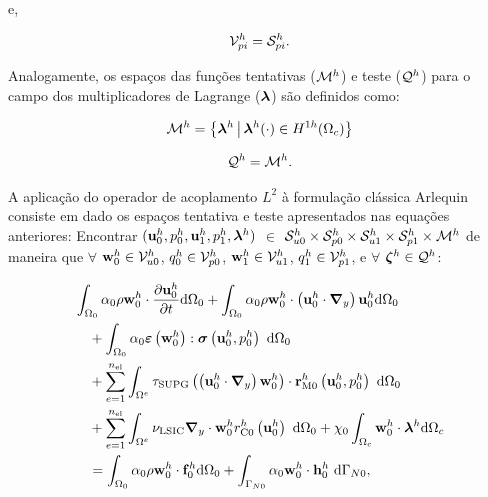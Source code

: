 \noindent e,

\begin{align}
	\mathcal{V}_{pi}^h = \mathcal{S}_{pi}^h.
\end{align}

Analogamente, os espaços das funções tentativas ($\mathcal{M}^h$) e teste ($\mathcal{Q}^h$) para o campo dos multiplicadores de Lagrange ($\boldsymbol{\lambda}$) são definidos como:

\begin{align}
	\mathcal{M}^h = \left\{ \boldsymbol{\lambda}^{h} \,\middle|\, \boldsymbol{\lambda}^{h}(\cdot) \in H^{1h}(\Omega_c) \right\}
\end{align}

\begin{align}
	\mathcal{Q}^h = \mathcal{M}^h.
\end{align}

A aplicação do operador de acoplamento $L^{2}$ à formulação clássica Arlequin consiste em dado os espaços tentativa e teste apresentados nas equações anteriores: Encontrar $(\mathbf{u}_0^h,p_0^h,\mathbf{u}_1^h,p_1^h,\boldsymbol{\lambda}^h)$ $\in$ $\mathcal{S}_{u0}^h \times \mathcal{S}_{p0}^h \times \mathcal{S}_{u1}^h \times \mathcal{S}_{p1}^h \times \mathcal{M}^h$ de maneira que  $\forall$ $\mathbf{w}_0^h \in \mathcal{V}_{u0}^h$, $q_0^h \in \mathcal{V}_{p0}^h$, $\mathbf{w}_1^h \in \mathcal{V}_{u1}^h$, $q_1^h \in \mathcal{V}_{p1}^h$, e $\forall$ $\boldsymbol{\zeta}^h \in \mathcal{Q}^h$:

\begin{align}
	\begin{split}
		&\int_{\globalModel} \arlequinWFGlobal \density \wglobalh \cdot \frac{\partial\uglobalh}{\partial t} \deriv \globalModel +
		\int_{\globalModel} \arlequinWFGlobal \density \wglobalh \cdot  \left(\uglobalh \cdot \gradient \right) \uglobalh \deriv \globalModel  \\ 
		&\quad+	
		\int_{\globalModel} \arlequinWFGlobal \straintensor \left(\wglobalh\right) : \stressTensor \left(\uglobalh,\pglobalh\right)\ \deriv \globalModel \\
		&\quad+ \sum_{e=1}^{\nel} \int_{\domainE} \SUPG  \left(\left(\uglobalh \cdot \gradient \right) \wglobalh\right) \cdot \resMomGlobal\left(\uglobalh,\pglobalh \right)\  \deriv \globalModel \\ 
		&\quad+\sum_{e=1}^{\nel} \int_{\domainE} \LSIC \divergence \cdot \wglobalh \resPreGlobal 
		 \left(\uglobalh\right)\  \deriv \globalModel 
		 + \chi_{0} \int_{\gluingZone} \wglobalh \cdot \lagrangeMultiplierh \deriv \gluingZone   \\ 
		 &\quad = \int_{\globalModel} \arlequinWFGlobal \density \wglobalh \cdot  \globalsbodyforceh \deriv \globalModel + \int_{\globalBoundaryN} \arlequinWFGlobal \wglobalh  \cdot \globalSurfaceLoadh\ \deriv \globalBoundaryN,
		\label{eq:QM_forma_fraca_0}
	\end{split}
\end{align}

